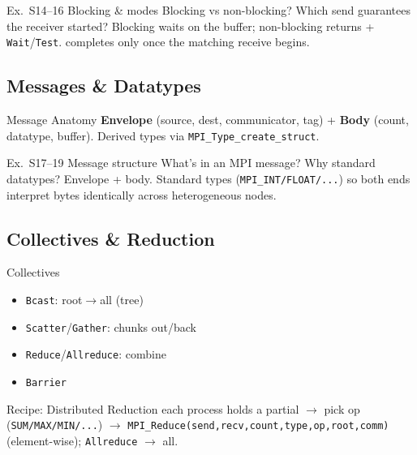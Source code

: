 \begin{example2}{Ex.\ S14--16 Blocking \& modes}
    Blocking vs non-blocking? Which send guarantees the receiver started?
    \tcblower
    Blocking waits on the buffer; non-blocking returns + \texttt{Wait}/\texttt{Test}.  completes only once the matching receive begins.
\end{example2}

\subsection{Messages \& Datatypes}

\begin{definition}{Message Anatomy}
    \textbf{Envelope} (source, dest, communicator, tag) + \textbf{Body} (count, datatype, buffer). Derived types via \texttt{MPI\_Type\_create\_struct}.
\end{definition}

\begin{example2}{Ex.\ S17--19 Message structure}
    What's in an MPI message? Why standard datatypes?
    \tcblower
    Envelope + body. Standard types (\texttt{MPI\_INT/FLOAT/...}) so both ends interpret bytes identically across heterogeneous nodes.
\end{example2}

\subsection{Collectives \& Reduction}

\begin{definition}{Collectives}
    \begin{itemize}
        \item \texttt{Bcast}: root$\to$all (tree)
        \item \texttt{Scatter}/\texttt{Gather}: chunks out/back
        \item \texttt{Reduce}/\texttt{Allreduce}: combine
        \item \texttt{Barrier}
    \end{itemize}
\end{definition}

\begin{KR}{Recipe: Distributed Reduction}
    each process holds a partial $\to$ pick op (\texttt{SUM/MAX/MIN/...}) $\to$ \texttt{MPI\_Reduce(send,recv,count,type,op,root,comm)} (element-wise); \texttt{Allreduce} $\to$ all.
\end{KR}

